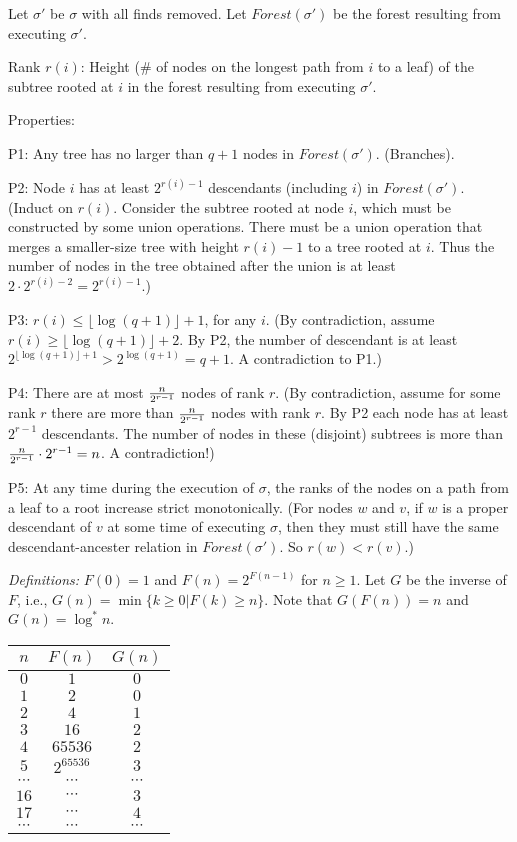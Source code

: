 \documentclass{article}
\begin{document}
\begin{itemize}
Let $\sigma'$ be $\sigma$ with all finds removed. Let $Forest(\sigma')$
be the forest resulting from executing $\sigma'$.

Rank $r(i)$: Height (\# of nodes on the longest path from $i$ to 
a leaf) of the subtree rooted at $i$ in the forest resulting from
executing $\sigma'$.

Properties:

P1: Any tree has no larger than $q+1$ nodes in $Forest(\sigma')$. (Branches).

P2: Node $i$ has at least $2^{r(i)-1}$ descendants (including $i$)
in $Forest(\sigma')$. (Induct on $r(i)$. Consider the subtree rooted
at node $i$, which must be constructed by some union operations. There
must be a union operation that 
merges a smaller-size tree with height $r(i)-1$
to a tree rooted at $i$. Thus the number of nodes in the tree
obtained after the union is at least $2\cdot 2^{r(i)-2}=2^{r(i)-1}$.)

P3: $r(i)\le \lfloor\log (q+1)\rfloor+1$, for any $i$. 
(By contradiction, assume $r(i)\ge \lfloor\log (q+1)\rfloor+2$.
By P2, the number of descendant is at least $2^{\lfloor\log (q+1)\rfloor+1}
>2^{\log (q+1)}=q+1$. A contradiction to P1.)

P4: There are at most ${n\over 2^{r-1}}$ nodes of rank $r$. 
(By contradiction, assume for some rank $r$ there are more than 
${n\over 2^{r-1}}$ nodes with rank $r$. By P2 each node has at least $2^{r-1}$
descendants. The number of nodes in these (disjoint) subtrees is more than
${n\over 2^{r-1}}\cdot 2^{r-1}=n$. A contradiction!)

P5: At any time during the execution of $\sigma$, the ranks of the nodes
on a path from a leaf to a root increase strict monotonically.
(For nodes $w$ and $v$, if $w$ is a proper descendant of $v$ at some time of executing $\sigma$,
then they must still have the same descendant-ancester relation in $Forest(\sigma')$. So $r(w)<r(v)$.)

{\em Definitions:} $F(0)=1$ and $F(n)=2^{F(n-1)}$ for $n\ge1$.
Let $G$ be the inverse of $F$, i.e., $G(n)=\min\{k\ge0|F(k)\ge n\}$.
Note that $G(F(n))=n$ and $G(n)=\log^* n$.

\begin{center}
\begin{tabular}{c|c|c}
$n$ & $F(n)$ & $G(n)$\\\hline
$0$ & $1$ & $0$\\
$1$ & $2$ & $0$\\\hline
$2$ & $4$ & $1$\\\hline
$3$ & $16$ & $2$\\
$4$ & $65536$ & $2$\\\hline
$5$ & $2^{65536}$ & $3$\\
$\cdots$ & $\cdots$ & $\cdots$\\
$16$ & $\cdots$ & $3$\\\hline
$17$ & $\cdots$ & $4$\\
$\cdots$ & $\cdots$ & $\cdots$\\
\end{tabular}
\end{center}


\end{itemize}
\end{document}
